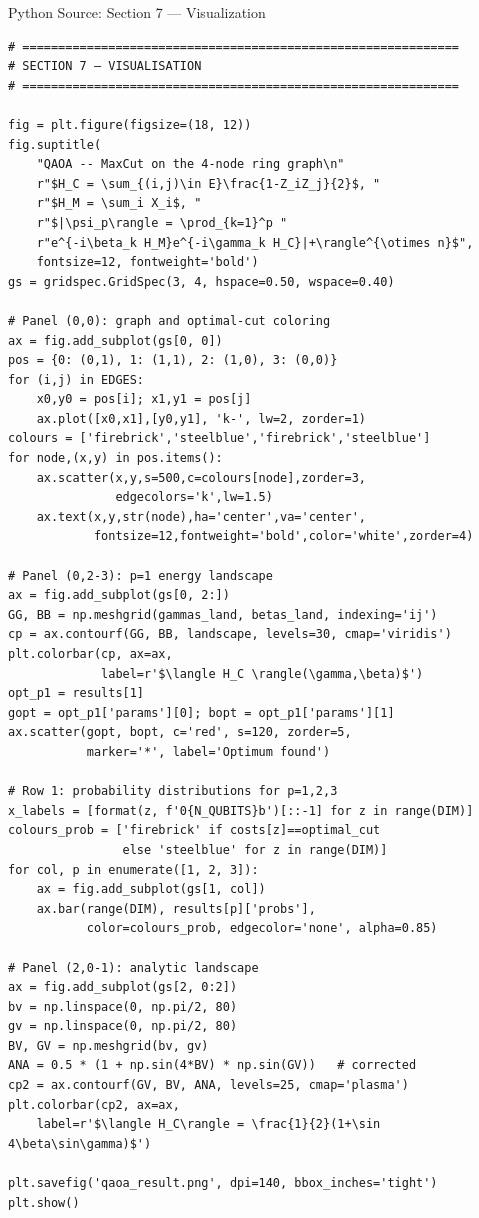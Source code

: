 \documentclass{beamer}
\begin{document}

\begin{frame}{Python Source: Section 7 — Visualization}
\footnotesize
\begin{verbatim}
# =============================================================
# SECTION 7 — VISUALISATION
# =============================================================

fig = plt.figure(figsize=(18, 12))
fig.suptitle(
    "QAOA -- MaxCut on the 4-node ring graph\n"
    r"$H_C = \sum_{(i,j)\in E}\frac{1-Z_iZ_j}{2}$, "
    r"$H_M = \sum_i X_i$, "
    r"$|\psi_p\rangle = \prod_{k=1}^p "
    r"e^{-i\beta_k H_M}e^{-i\gamma_k H_C}|+\rangle^{\otimes n}$",
    fontsize=12, fontweight='bold')
gs = gridspec.GridSpec(3, 4, hspace=0.50, wspace=0.40)

# Panel (0,0): graph and optimal-cut coloring
ax = fig.add_subplot(gs[0, 0])
pos = {0: (0,1), 1: (1,1), 2: (1,0), 3: (0,0)}
for (i,j) in EDGES:
    x0,y0 = pos[i]; x1,y1 = pos[j]
    ax.plot([x0,x1],[y0,y1], 'k-', lw=2, zorder=1)
colours = ['firebrick','steelblue','firebrick','steelblue']
for node,(x,y) in pos.items():
    ax.scatter(x,y,s=500,c=colours[node],zorder=3,
               edgecolors='k',lw=1.5)
    ax.text(x,y,str(node),ha='center',va='center',
            fontsize=12,fontweight='bold',color='white',zorder=4)

# Panel (0,2-3): p=1 energy landscape
ax = fig.add_subplot(gs[0, 2:])
GG, BB = np.meshgrid(gammas_land, betas_land, indexing='ij')
cp = ax.contourf(GG, BB, landscape, levels=30, cmap='viridis')
plt.colorbar(cp, ax=ax,
             label=r'$\langle H_C \rangle(\gamma,\beta)$')
opt_p1 = results[1]
gopt = opt_p1['params'][0]; bopt = opt_p1['params'][1]
ax.scatter(gopt, bopt, c='red', s=120, zorder=5,
           marker='*', label='Optimum found')

# Row 1: probability distributions for p=1,2,3
x_labels = [format(z, f'0{N_QUBITS}b')[::-1] for z in range(DIM)]
colours_prob = ['firebrick' if costs[z]==optimal_cut
                else 'steelblue' for z in range(DIM)]
for col, p in enumerate([1, 2, 3]):
    ax = fig.add_subplot(gs[1, col])
    ax.bar(range(DIM), results[p]['probs'],
           color=colours_prob, edgecolor='none', alpha=0.85)

# Panel (2,0-1): analytic landscape
ax = fig.add_subplot(gs[2, 0:2])
bv = np.linspace(0, np.pi/2, 80)
gv = np.linspace(0, np.pi/2, 80)
BV, GV = np.meshgrid(bv, gv)
ANA = 0.5 * (1 + np.sin(4*BV) * np.sin(GV))   # corrected
cp2 = ax.contourf(GV, BV, ANA, levels=25, cmap='plasma')
plt.colorbar(cp2, ax=ax,
    label=r'$\langle H_C\rangle = \frac{1}{2}(1+\sin 4\beta\sin\gamma)$')

plt.savefig('qaoa_result.png', dpi=140, bbox_inches='tight')
plt.show()
\end{verbatim}
\end{frame}
\end{document}
